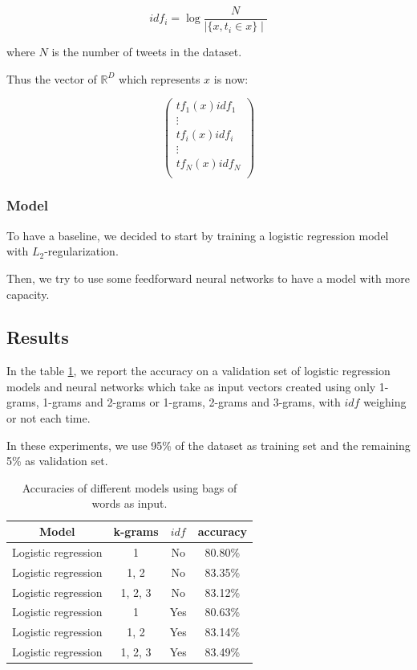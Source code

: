 \documentclass[10pt,conference,compsocconf]{IEEEtran}
\begin{document}
$$
idf_i = \log{\frac{N}{\mid \{x, t_i \in x \} \mid}}
$$

where $N$ is the number of tweets in the dataset.

Thus the vector of $\mathbb{R}^D$ which represents $x$ is now:

$$
\left(
\begin{array}{c}
tf_1(x)idf_1 \\
\vdots \\
tf_i(x)idf_i \\
\vdots \\
tf_N(x)idf_N \\
\end{array}
\right)
$$

\subsubsection{Model}

To have a baseline, we decided to start by training a logistic regression model with $L_2$-regularization.

Then, we try to use some feedforward neural networks to have a model with more capacity.

\subsection{Results}

In the table \ref{accuracies_bow}, we report the accuracy on a validation set of logistic regression models and neural networks which take as input vectors created using only 1-grams, 1-grams and 2-grams or 1-grams, 2-grams and 3-grams, with $idf$ weighing or not each time.

In these experiments, we use 95\% of the dataset as training set and the remaining 5\% as validation set.

\begin{table}
\begin{center}
\begin{tabular}{|c|c|c|c|}
\hline
Model & k-grams & $idf$ & accuracy \\
\hline
Logistic regression & 1 & No & 80.80\% \\
\hline
Logistic regression & 1, 2 & No & 83.35\% \\
\hline
Logistic regression & 1, 2, 3 & No & 83.12\% \\
\hline
Logistic regression & 1 & Yes & 80.63\% \\
\hline
Logistic regression & 1, 2 & Yes & 83.14\% \\
\hline
Logistic regression & 1, 2, 3 & Yes & 83.49\% \\
\hline
\end{tabular}
\label{accuracies_bow}
\caption{Accuracies of different models using bags of words as input.}
\end{center}
\end{table}
\end{document}
